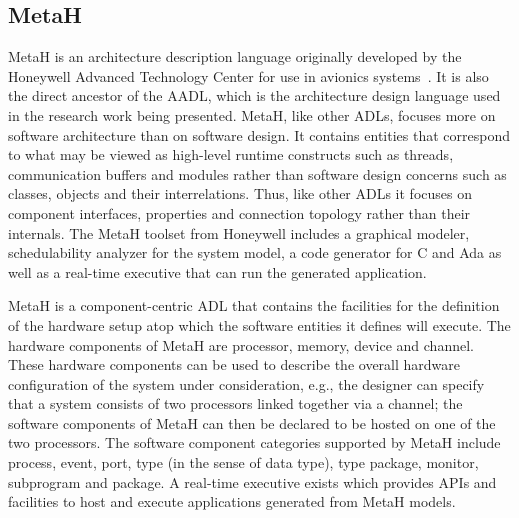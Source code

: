 \subsection{MetaH}
MetaH is an architecture description language originally developed by
the Honeywell Advanced Technology Center for use in avionics
systems~\cite{metah-manual}. It is also the direct ancestor of the
AADL, which is the architecture design language used in the research
work being presented. MetaH, like other ADLs, focuses more on software
architecture than on software design. It contains entities that
correspond to what may be viewed as high-level runtime constructs such
as threads, communication buffers and modules rather than software
design concerns such as classes, objects and their
interrelations. Thus, like other ADLs it focuses on component
interfaces, properties and connection topology rather than their
internals. The MetaH toolset from Honeywell includes a graphical
modeler, schedulability analyzer for the system model, a code
generator for C and Ada as well as a real-time executive that can run
the generated application.

MetaH is a component-centric ADL that contains the facilities for the
definition of the hardware setup atop which the software entities it
defines will execute. The hardware components of MetaH are processor,
memory, device and channel. These hardware components can be used to
describe the overall hardware configuration of the system under
consideration, e.g., the designer can specify that a system consists
of two processors linked together via a channel; the software
components of MetaH can then be declared to be hosted on one of the
two processors. The software component categories supported by MetaH
include process, event, port, type (in the sense of data type), type
package, monitor, subprogram and package. A real-time executive exists
which provides APIs and facilities to host and execute applications
generated from MetaH models.

